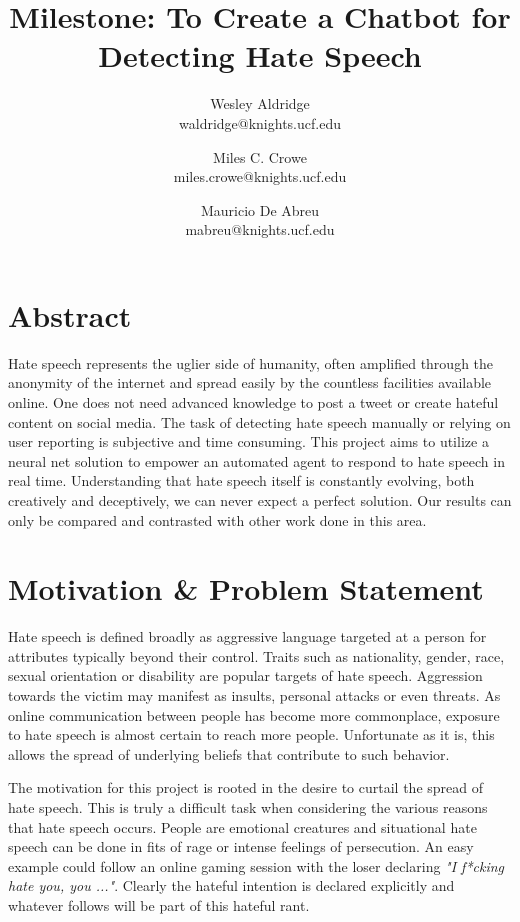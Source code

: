 \documentclass[conference]{sig-alternate-05-2015}
\begin{document}
\title{Milestone: To Create a Chatbot for Detecting Hate Speech}

\author{Wesley Aldridge\\ waldridge@knights.ucf.edu \and Miles C. Crowe  \\ miles.crowe@knights.ucf.edu \and Mauricio De Abreu\\ mabreu@knights.ucf.edu}

\maketitle

\section{Abstract}
Hate speech represents the uglier side of humanity, often amplified through the anonymity of the internet and spread easily by the countless facilities available online.  One does not need advanced knowledge to post a tweet or create hateful content on social media.  The task of detecting hate speech manually or relying on user reporting is subjective and time consuming.  This project aims to utilize a neural net solution to empower an automated agent to respond to hate speech in real time.  Understanding that hate speech itself is constantly evolving, both creatively and deceptively, we can never expect a perfect solution.  Our results can only be compared and contrasted with other work done in this area.

\section{Motivation \& Problem Statement}\label{sec:motivation}
Hate speech is defined broadly as aggressive language targeted at a person for attributes typically beyond their control.  Traits such as nationality, gender, race, sexual orientation or disability are popular targets of hate speech\cite{Dictionary.com}.  Aggression towards the victim may manifest as insults, personal attacks or even threats.  As online communication between people has become more commonplace, exposure to hate speech is almost certain to reach more people.  Unfortunate as it is, this allows the spread of underlying beliefs that contribute to such behavior.

The motivation for this project is rooted in the desire to curtail the spread of hate speech.  This is truly a difficult task when considering the various reasons that hate speech occurs.  People are emotional creatures and situational hate speech can be done in fits of rage or intense feelings of persecution.  An easy example could follow an online gaming session with the loser declaring \textit{"I f*cking hate you, you ..."}.  Clearly the hateful intention is declared explicitly and whatever follows will be part of this hateful rant.  
\end{document}
